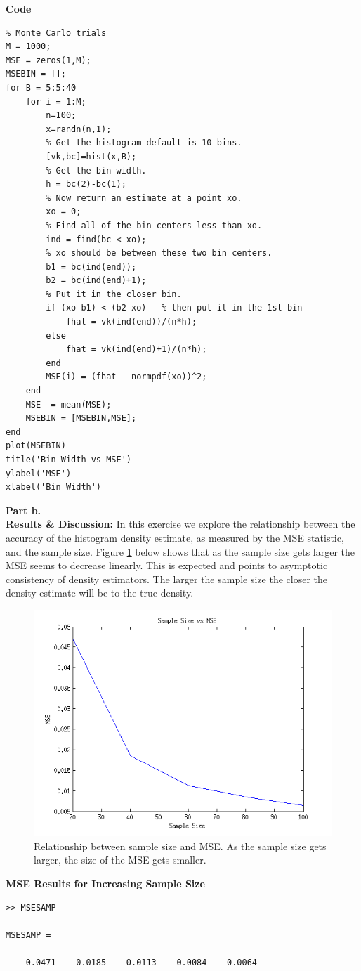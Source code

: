 \documentclass[12pt,a4paper]{article}
\begin{document}
\textbf{Code}
\begin{verbatim}
% Monte Carlo trials
M = 1000;
MSE = zeros(1,M);
MSEBIN = [];
for B = 5:5:40
    for i = 1:M;
        n=100;
        x=randn(n,1);
        % Get the histogram-default is 10 bins.
        [vk,bc]=hist(x,B);
        % Get the bin width.
        h = bc(2)-bc(1);
        % Now return an estimate at a point xo.
        xo = 0;
        % Find all of the bin centers less than xo.
        ind = find(bc < xo);
        % xo should be between these two bin centers.
        b1 = bc(ind(end));
        b2 = bc(ind(end)+1);
        % Put it in the closer bin.
        if (xo-b1) < (b2-xo)   % then put it in the 1st bin
            fhat = vk(ind(end))/(n*h);
        else
            fhat = vk(ind(end)+1)/(n*h);
        end
        MSE(i) = (fhat - normpdf(xo))^2;
    end
    MSE  = mean(MSE);
    MSEBIN = [MSEBIN,MSE];
end
plot(MSEBIN)
title('Bin Width vs MSE')
ylabel('MSE')
xlabel('Bin Width')
\end{verbatim}

\textbf{Part b.}\\
\textbf{Results \& Discussion: } In this exercise we explore the relationship between the accuracy of the histogram density estimate, as measured by the MSE statistic, and the sample size. Figure \ref{q3 fig2} below shows that as the sample size gets larger the MSE seems to decrease linearly. This is expected and points to asymptotic consistency of density estimators. The larger the sample size the closer the density estimate will be to the true density. 

\begin{figure}[ht!] 
\begin{center}
\includegraphics[scale=.86]{q9p3b_graph.png}
\caption{Relationship between sample size and MSE. As the sample size gets larger, the size of the MSE gets smaller.}
\label{q3 fig2}
\end{center}
\end{figure}
\FloatBarrier
\textbf{MSE Results for Increasing Sample Size}
\begin{verbatim}
>> MSESAMP

MSESAMP =

    0.0471    0.0185    0.0113    0.0084    0.0064
\end{verbatim}
\end{document}
